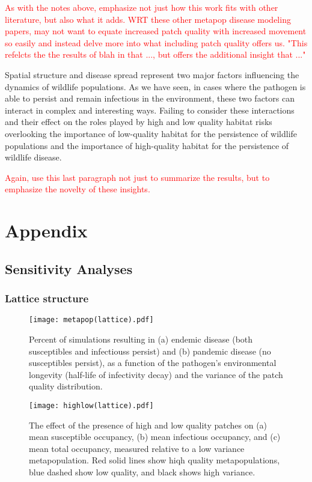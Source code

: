 \documentclass{svjour3}
\begin{document}
\textcolor{red}{As with the notes above, emphasize not just how this work fits with other literature, but also what it adds.  WRT these other metapop disease modeling papers, may not want to equate increased patch quality with increased movement so easily and instead delve more into what including patch quality offers us.  "This refelcts the the results of blah in that ..., but offers the additional insight that ..."}

Spatial structure and disease spread represent two major factors influencing the dynamics of wildlife populations.  As we have seen, in cases where the pathogen is able to persist and remain infectious in the environment, these two factors can interact in complex and interesting ways.  Failing to consider these interactions and their effect on the roles played by high and low quality habitat risks overlooking the importance of low-quality habitat for the persistence of wildlife populations and the importance of high-quality habitat for the persistence of wildlife disease.

\textcolor{red}{Again, use this last paragraph not just to summarize the results, but to emphasize the novelty of these insights.}

\clearpage

\section{Appendix}

\subsection{Sensitivity Analyses}

\subsubsection{Lattice structure}

\begin{figure}[h!]
\centering
\texttt{[image: metapop(lattice).pdf]}
\caption{Percent of simulations resulting in (a) endemic disease (both susceptibles and infectiouss persist) and (b) pandemic disease (no susceptibles persist), as a function of the pathogen's environmental longevity (half-life of infectivity decay) and the variance of the patch quality distribution.}
\label{poutcome_lattice}
\end{figure}   

\begin{figure}
\centering
\texttt{[image: highlow(lattice).pdf]}
\caption{The effect of the presence of high and low quality patches on (a) mean susceptible occupancy, (b) mean infectious occupancy, and (c) mean total occupancy, measured relative to  a low variance metapopulation.  Red solid lines show hiqh quality metapopulations, blue dashed show low quality, and black shows high variance.}
\label{sens_lattice}
\end{figure}
\end{document}

